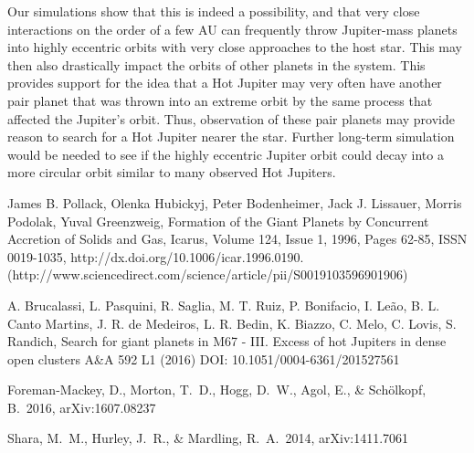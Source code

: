 \documentclass[12pt]{article}
\begin{document}
Our simulations show that this is indeed a possibility, and that very close
interactions on the order of a few AU can frequently throw Jupiter-mass planets into
highly eccentric orbits with very close approaches to the host star. 
This may then also drastically impact the orbits of other planets
in the system. This provides support for the idea that a Hot Jupiter may very
often have another pair planet that was thrown into an extreme orbit by the same
process that affected the Jupiter's orbit. Thus,
observation of these pair planets may provide reason to search for a Hot Jupiter
nearer the star.
Further long-term simulation would be needed to see if the highly eccentric Jupiter
orbit could decay into a more circular orbit similar to many observed Hot Jupiters.

\clearpage

\begin{thebibliography}{9}

James B. Pollack, Olenka Hubickyj, Peter Bodenheimer, Jack J. Lissauer, Morris Podolak, Yuval Greenzweig, Formation of the Giant Planets by Concurrent Accretion of Solids and Gas, Icarus, Volume 124, Issue 1, 1996, Pages 62-85, ISSN 0019-1035, http://dx.doi.org/10.1006/icar.1996.0190.
(http://www.sciencedirect.com/science/article/pii/S0019103596901906)

A.  Brucalassi, L.  Pasquini, R.  Saglia, M. T.  Ruiz, P.  Bonifacio, I.  Leão, B. L.  Canto Martins, J. R.  de Medeiros, L. R.  Bedin, K.  Biazzo, C.  Melo, C.  Lovis, S.  Randich,
Search for giant planets in M67 - III. Excess of hot Jupiters in dense open clusters
A\&A 592 L1 (2016)
DOI: 10.1051/0004-6361/201527561

Foreman-Mackey, D., Morton, T.~D., Hogg, D.~W., Agol, E., \& Sch{\"o}lkopf, B.\ 2016, arXiv:1607.08237 

 Shara, M.~M., Hurley, J.~R., \& Mardling, R.~A.\ 2014, arXiv:1411.7061 

\end{thebibliography}
\end{document}
